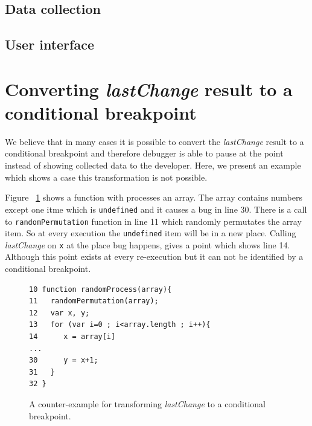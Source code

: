 \documentclass[preprint]{sigplanconf}
\begin{document}
\subsection{Data collection}

\subsection{User interface}

\section{Converting \textit{lastChange} result to a conditional breakpoint}
We believe that in many cases it is possible to convert the \textit{lastChange} result to a conditional breakpoint and therefore debugger is able to pause at the point
 instead of showing collected data to the developer. Here, we present an example which shows a case this transformation is not possible.

Figure ~\ref{fig:counter-example} shows a function with processes an array. The array contains numbers except one itme which is \texttt{undefined} and it causes a bug in line 30. There is a call to \texttt{randomPermutation} function in line 11 which randomly permutates the array item. So at every execution the \texttt{undefined} item will be in a new place. Calling \textit{lastChange} on \texttt{x} at the place bug happens, gives a point which shows line 14. Although this point exists at every re-execution but it can not be identified by a conditional breakpoint. 

\begin{figure}[htp]
\begin{verbatim}
10 function randomProcess(array){
11   randomPermutation(array);
12   var x, y;
13   for (var i=0 ; i<array.length ; i++){
14      x = array[i]
...
30      y = x+1;
31   }
32 }
\end{verbatim}
\caption{A counter-example for transforming \textit{lastChange} to a conditional breakpoint.}
\label{fig:counter-example}
\end{figure}
 

\end{document}
